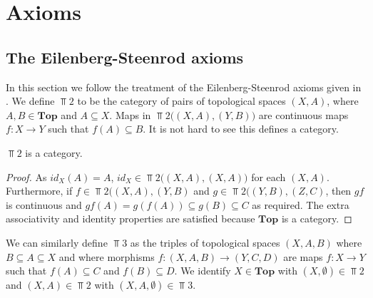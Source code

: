 \section{Axioms}\label{sec-axioms}
\subsection{The Eilenberg-Steenrod axioms}
In this section we follow the treatment of the Eilenberg-Steenrod axioms given in \cite{Werndli}. We define $\Top{2}$ to be the category of pairs of topological spaces $(X,A)$, where $A,B\in \mathbf{Top}$ and $A\subseteq X$. Maps in $\Top{2}\big((X,A),(Y,B)\big)$ are continuous maps $f:X\rightarrow Y$ such that $f(A)\subseteq B$. It is not hard to see this defines a category.

\begin{lemma}
$\Top{2}$ is a category.
\end{lemma}
\begin{proof}
As $id_X(A)=A$, $id_X\in \Top{2}\big((X,A),(X,A)\big)$ for each $(X,A)$. Furthermore, if $f\in \Top{2}((X,A),(Y,B)$ and $g\in \Top{2}((Y,B),(Z,C)$, then $gf$ is continuous and $gf(A)= g(f(A))\subseteq g(B)\subseteq C$ as required. The extra associativity and identity properties are satisfied because $\mathbf{Top}$ is a category.
\end{proof}

We can similarly define $\Top{3}$ as the triples of topological spaces $(X,A,B)$ where $B\subseteq A \subseteq X$ and where morphisms $f:(X,A,B)\rightarrow (Y,C,D)$ are maps $f:X\rightarrow Y$ such that $f(A)\subseteq C$ and $f(B)\subseteq D$. We identify $X\in \mathbf{Top}$ with $(X,\emptyset)\in \Top{2}$ and $(X,A)\in \Top{2}$ with $(X,A,\emptyset)\in \Top{3}$.

